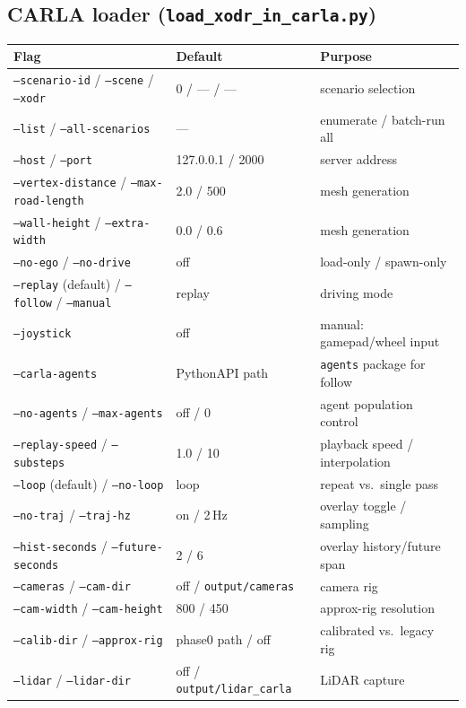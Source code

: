 \documentclass[11pt]{article}
\newcommand{\code}[1]{{\setlength{\fboxsep}{1.5pt}\colorbox{codegray}{\small\texttt{#1}}}}
\newcommand{\file}[1]{\texttt{#1}}
\begin{document}
\subsection{CARLA loader (\file{load\_xodr\_in\_carla.py})}
\begin{center}
\scriptsize
\setlength{\tabcolsep}{3pt}
\begin{tabular}{@{}lll@{}}
\toprule
\textbf{Flag} & \textbf{Default} & \textbf{Purpose} \\
\midrule
\code{--scenario-id} / \code{--scene} / \code{--xodr} & 0 / --- / --- & scenario selection \\
\code{--list} / \code{--all-scenarios} & --- & enumerate / batch-run all \\
\code{--host} / \code{--port} & 127.0.0.1 / 2000 & server address \\
\code{--vertex-distance} / \code{--max-road-length} & 2.0 / 500 & mesh generation \\
\code{--wall-height} / \code{--extra-width} & 0.0 / 0.6 & mesh generation \\
\code{--no-ego} / \code{--no-drive} & off & load-only / spawn-only \\
\code{--replay} (default) / \code{--follow} / \code{--manual} & replay & driving mode \\
\code{--joystick}       & off    & manual: gamepad/wheel input \\
\code{--carla-agents}   & PythonAPI path & \code{agents} package for follow \\
\code{--no-agents} / \code{--max-agents} & off / 0 & agent population control \\
\code{--replay-speed} / \code{--substeps} & 1.0 / 10 & playback speed / interpolation \\
\code{--loop} (default) / \code{--no-loop} & loop & repeat vs.\ single pass \\
\code{--no-traj} / \code{--traj-hz} & on / 2\,Hz & overlay toggle / sampling \\
\code{--hist-seconds} / \code{--future-seconds} & 2 / 6 & overlay history/future span \\
\code{--cameras} / \code{--cam-dir} & off / \file{output/cameras} & camera rig \\
\code{--cam-width} / \code{--cam-height} & 800 / 450 & approx-rig resolution \\
\code{--calib-dir} / \code{--approx-rig} & phase0 path / off & calibrated vs.\ legacy rig \\
\code{--lidar} / \code{--lidar-dir} & off / \file{output/lidar\_carla} & LiDAR capture \\

\end{tabular}
\end{center}
\end{document}
